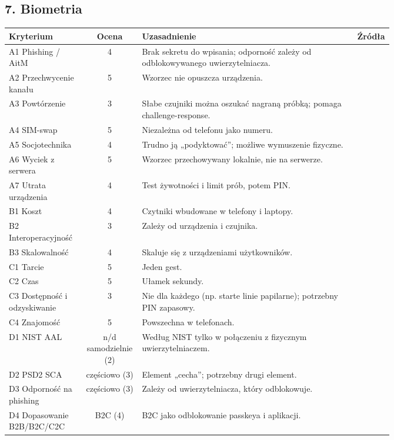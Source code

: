 \subsection*{7. Biometria}
\begingroup\small
\begin{longtable}{@{}p{0.2\linewidth}c p{0.56\linewidth}l@{}}
\toprule
Kryterium & Ocena & Uzasadnienie & Źródła \\
\midrule
\endhead
A1 Phishing / AitM & 4 & Brak sekretu do wpisania; odporność zależy od odblokowywanego uwierzytelniacza. & \cite{S1,N1} \\
A2 Przechwycenie kanału & 5 & Wzorzec nie opuszcza urządzenia. & \cite{N1,P13} \\
A3 Powtórzenie & 3 & Słabe czujniki można oszukać nagraną próbką; pomaga challenge-response. & \cite{P16,P13} \\
A4 SIM-swap & 5 & Niezależna od telefonu jako numeru. & \cite{N1} \\
A5 Socjotechnika & 4 & Trudno ją „podyktować”; możliwe wymuszenie fizyczne. & \cite{P13} \\
A6 Wyciek z serwera & 5 & Wzorzec przechowywany lokalnie, nie na serwerze. & \cite{N1,S1} \\
A7 Utrata urządzenia & 4 & Test żywotności i limit prób, potem PIN. & \cite{P14,N6} \\
B1 Koszt & 4 & Czytniki wbudowane w telefony i laptopy. & \cite{P15} \\
B2 Interoperacyjność & 3 & Zależy od urządzenia i czujnika. & \cite{P13,P2} \\
B3 Skalowalność & 4 & Skaluje się z urządzeniami użytkowników. & \cite{P15} \\
C1 Tarcie & 5 & Jeden gest. & \cite{P15,P2} \\
C2 Czas & 5 & Ułamek sekundy. & \cite{P15} \\
C3 Dostępność i odzyskiwanie & 3 & Nie dla każdego (np. starte linie papilarne); potrzebny PIN zapasowy. & \cite{P15,P13} \\
C4 Znajomość & 5 & Powszechna w telefonach. & \cite{P15} \\
D1 NIST AAL & n/d samodzielnie (2) & Według NIST tylko w połączeniu z fizycznym uwierzytelniaczem. & \cite{N1} \\
D2 PSD2 SCA & częściowo (3) & Element „cecha”; potrzebny drugi element. & \cite{N3} \\
D3 Odporność na phishing & częściowo (3) & Zależy od uwierzytelniacza, który odblokowuje. & \cite{N1} \\
D4 Dopasowanie B2B/B2C/C2C & B2C (4) & B2C jako odblokowanie passkeya i aplikacji. & \cite{P15,R2} \\
\bottomrule
\end{longtable}
\endgroup

